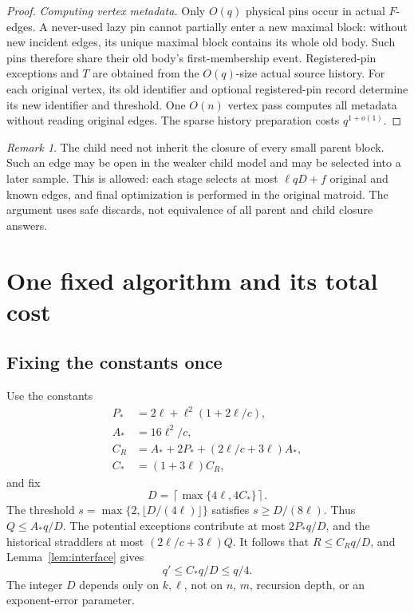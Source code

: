 \documentclass[11pt,a4paper]{article}
\theoremstyle{definition}
\theoremstyle{remark}
\newtheorem{remark}[theorem]{Remark}
\begin{document}
\begin{proof}
\emph{Computing vertex metadata.}
Only $O(q)$ physical pins occur in actual $F$-edges.
A never-used lazy pin cannot partially enter a
new maximal block: without new incident edges,
its unique maximal block contains its whole old
body. Such pins therefore share their old body's
first-membership event.
Registered-pin exceptions and $T$ are obtained
from the $O(q)$-size actual source history.
For each original vertex, its old identifier and
optional registered-pin record determine its new
identifier and threshold. One $O(n)$ vertex pass
computes all metadata without reading original
edges. The sparse history preparation costs
$q^{1+o(1)}$.
\end{proof}

\begin{remark}
The child need not inherit the closure of every small
parent block. Such an edge may be open in the weaker
child model and may be selected into a later sample.
This is allowed: each stage selects at most
$\ell qD+f$ original and known edges, and final
optimization is performed in the original matroid.
The argument uses safe discards, not equivalence of
all parent and child closure answers.
\end{remark}

\section{One fixed algorithm and its total cost}
\label{sec:complete}

\subsection{Fixing the constants once}

Use the constants
\begin{align*}
 P_*&=2\ell+\ell^2(1+2\ell/c),\\
 A_*&=16\ell^2/c,\\
 C_R&=A_*+2P_*+(2\ell/c+3\ell)A_*,\\
 C_*&=(1+3\ell)C_R,
\end{align*}
and fix
\begin{equation}\label{eq:fixed-D}
 D=\left\lceil\max\{4\ell,4C_*\}\right\rceil.
\end{equation}
The threshold $s=\max\{2,\lfloor D/(4\ell)\rfloor\}$
satisfies $s\geq D/(8\ell)$.
Thus $Q\leq A_*q/D$.
The potential exceptions contribute at most $2P_*q/D$,
and the historical straddlers at most
$(2\ell/c+3\ell)Q$.
It follows that $R\leq C_Rq/D$, and
Lemma~\ref{lem:interface} gives
\begin{equation}\label{eq:geometric}
 q'\leq C_*q/D\leq q/4.
\end{equation}
The integer $D$ depends only on $k,\ell$, not on $n$,
$m$, recursion depth, or an exponent-error parameter.
\end{document}
